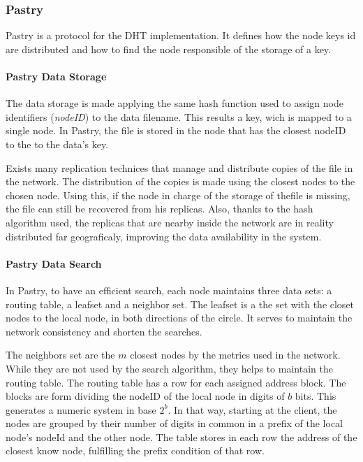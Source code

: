 \subsubsection{Pastry}
\label{sec:pastry}
Pastry is a protocol for the DHT implementation. It defines how the node keys id
are distributed and how to find the node responsible of the storage of a key.

\paragraph{Pastry Data Storage}

The data storage is made applying the same hash function used to assign node
identifiers (\textit{nodeID}) to the data filename. This results a key, wich is
mapped to a single node. In Pastry, the file is stored in the node that has the closest nodeID to
the to the data's key.

Exists many replication technices that manage and distribute copies of the file
in the network. The distribution of the copies is made using the closest nodes
to the chosen node. Using this, if the node in charge of the storage of thefile
is missing, the file can still be recovered from his replicas. Also, thanks
to the hash algorithm used, the replicas that are nearby inside the network are
in reality distributed far geograficaly, improving the data availability
in the system.

\paragraph{Pastry Data Search}

In Pastry, to have an efficient search, each node maintains three data sets:
a routing table, a leafset and a neighbor set.
The leafset is a the set with the closet nodes to the local node, in both
directions of the circle. It serves to maintain the network consistency and
shorten the searches.

The neighbors set are the $m$ closest nodes by the metrics used in the network.
While they are not used by the search algorithm, they helps to maintain the
routing table.
The routing table has a row for each assigned address block. The blocks are
form dividing the nodeID of the local node in digits of $b$ bits. This
generates a numeric system in base $2^b$. In that way, starting at the client,
the nodes are grouped by their number of digits in common in a prefix of the
local node's nodeId and the other node. The table stores in each row the
address of the closest know node, fulfilling the prefix condition of that row.

